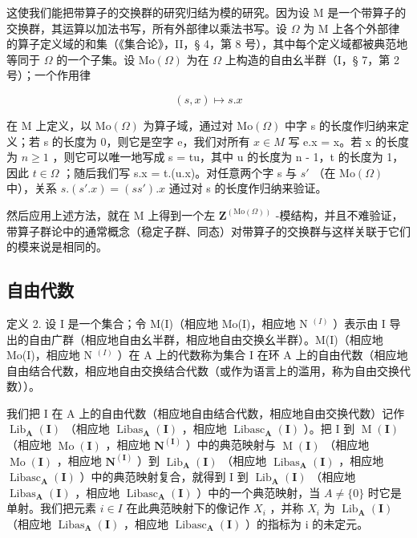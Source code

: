 这使我们能把带算子的交换群的研究归结为模的研究。因为设 M 是一个带算子的交换群，其运算以加法书写，所有外部律以乘法书写。设 \(\Omega\) 为 M 上各个外部律的算子定义域的和集（《集合论》，II，§ 4，第 8 号），其中每个定义域都被典范地等同于 \(\Omega\) 的一个子集。设 \(\mathrm{Mo}(\Omega)\) 为在 \(\Omega\) 上构造的自由幺半群（I，§ 7，第 2 号）；一个作用律

\[
(s, x) \mapsto s. x
\]

在 M 上定义，以 \(\mathrm{Mo}(\Omega)\) 为算子域，通过对 \(\mathrm{Mo}(\Omega)\) 中字 s 的长度作归纳来定义；若 s 的长度为 0，则它是空字 e，我们对所有 \(x \in M\) 写 e.x = x。若 x 的长度为 \(n \geqslant 1\) ，则它可以唯一地写成 s = tu，其中 u 的长度为 n - 1，t 的长度为 1，因此 \(t \in \Omega\) ；随后我们写 s.x = t.(u.x)。对任意两个字 s 与 \(s'\) （在 \(\mathrm{Mo}(\Omega)\) 中），关系 \(s.(s'.x) = (ss').x\) 通过对 s 的长度作归纳来验证。

然后应用上述方法，就在 M 上得到一个左 \(\mathbf{Z}^{(\mathrm{Mo}(\Omega))}\) -模结构，并且不难验证，带算子群论中的通常概念（稳定子群、同态）对带算子的交换群与这样关联于它们的模来说是相同的。

\subsection{自由代数}

定义 2. 设 I 是一个集合；令 M(I)（相应地 Mo(I)，相应地 N \(^{(I)}\) ）表示由 I 导出的自由广群（相应地自由幺半群，相应地自由交换幺半群）。M(I)（相应地 Mo(I)，相应地 N \(^{(I)}\) ）在 A 上的代数称为集合 I 在环 A 上的自由代数（相应地自由结合代数，相应地自由交换结合代数（或作为语言上的滥用，称为自由交换代数））。

我们把 I 在 A 上的自由代数（相应地自由结合代数，相应地自由交换代数）记作 \(\operatorname{Lib}_{\mathbf{A}}(\mathbf{I})\) （相应地 \(\operatorname{Libas}_{\mathbf{A}}(\mathbf{I})\) ，相应地 \(\operatorname{Libasc}_{\mathbf{A}}(\mathbf{I})\) ）。把 I 到 \(\operatorname{M}(\mathbf{I})\) （相应地 \(\operatorname{Mo}(\mathbf{I})\) ，相应地 \(\mathbf{N}^{(\mathbf{I})}\) ）中的典范映射与 \(\operatorname{M}(\mathbf{I})\) （相应地 \(\operatorname{Mo}(\mathbf{I})\) ，相应地 \(\mathbf{N}^{(\mathbf{I})}\) ）到 \(\operatorname{Lib}_{\mathbf{A}}(\mathbf{I})\) （相应地 \(\operatorname{Libas}_{\mathbf{A}}(\mathbf{I})\) ，相应地 \(\operatorname{Libasc}_{\mathbf{A}}(\mathbf{I})\) ）中的典范映射复合，就得到 I 到 \(\operatorname{Lib}_{\mathbf{A}}(\mathbf{I})\) （相应地 \(\operatorname{Libas}_{\mathbf{A}}(\mathbf{I})\) ，相应地 \(\operatorname{Libasc}_{\mathbf{A}}(\mathbf{I})\) ）中的一个典范映射，当 \(A \neq \{0\}\) 时它是单射。我们把元素 \(i \in I\) 在此典范映射下的像记作 \(X_{i}\) ，并称 \(X_{i}\) 为 \(\operatorname{Lib}_{\mathbf{A}}(\mathbf{I})\) （相应地 \(\operatorname{Libas}_{\mathbf{A}}(\mathbf{I})\) ，相应地 \(\operatorname{Libasc}_{\mathbf{A}}(\mathbf{I})\) ）的指标为 i 的未定元。

